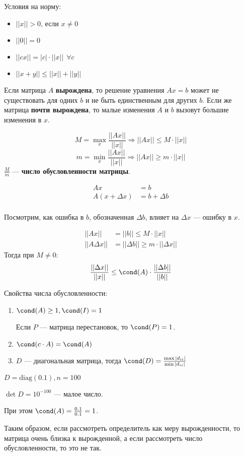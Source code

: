 Условия на норму:
\begin{itemize}
    \item \(||x|| > 0\), если \(x \neq 0\)
    \item \(||0|| = 0\)
    \item \(||cx|| = |c| \cdot ||x|| \ \ \forall c\)
    \item \(||x + y|| \leq ||x|| + ||y||\)
\end{itemize}

Если матрица \(A\) \textbf{вырождена}, то решение уравнения \(Ax = b\) может не существовать для одних \(b\) и не быть единственным для других \(b\). Если же матрица \textbf{почти вырождена}, то малые изменения \(A\) и \(b\) вызовут большие изменения в \(x\).

\begin{definition}
    \[M = \max_x \frac{||Ax||}{||x||} \Rightarrow ||Ax|| \leq M \cdot ||x||\]
    \[m = \min_x \frac{||Ax||}{||x||} \Rightarrow ||Ax|| \geq m \cdot ||x||\]
    \(\frac{M}{m}\) --- \textbf{число обусловленности матрицы}.
\end{definition}

\begin{align}
    Ax              & = b            \\
    A(x + \Delta x) & = b + \Delta b \\
\end{align}

Посмотрим, как ошибка в \(b\), обозначенная \(\Delta b\), влияет на \(\Delta x\) --- ошибку в \(x\).

\begin{align*}
    ||Ax||          & = ||b|| \leq M \cdot ||x||                \\
    ||A \Delta x || & =  ||\Delta b|| \geq m \cdot ||\Delta x||
\end{align*}
Тогда при \(M \neq 0\):
\[\frac{||\Delta x||}{||x||} \leq \cond(A) \cdot \frac{||\Delta b||}{||b||}\]

Свойства числа обусловленности:
\begin{enumerate}
    \item \(\cond(A) \geq 1, \cond(I) = 1\)

          Если \(P\) --- матрица перестановок, то \(\cond(P) = 1\).

    \item \(\cond(c \cdot A) = \cond(A)\)
    \item \(D\) --- диагональная матрица, тогда \(\cond(D) = \frac{\max |d_{ii}|}{\min |d_{ii}|}\)
\end{enumerate}

\begin{example}
    \(D = \text{diag}(0.1), n = 100\)

    \(\det D = 10^{ - 100}\) --- малое число.

    При этом \(\cond(A) = \frac{0.1}{0.1} = 1\).

    Таким образом, если рассмотреть определитель как меру вырожденности, то матрица очень близка к вырожденной, а если рассмотреть число обусловленности, то это не так.
\end{example}
